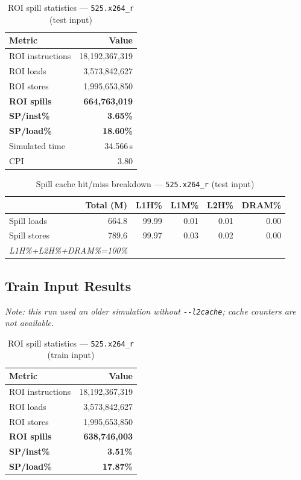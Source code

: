 \documentclass[11pt,a4paper]{article}
\begin{document}
\begin{table}[H]
\centering
\caption{ROI spill statistics --- \texttt{525.x264\_r} (test input)}
\label{tab:x264_test_roi}
\begin{tabular}{lr}
\toprule
\textbf{Metric} & \textbf{Value} \\
\midrule
ROI instructions & 18,192,367,319 \\
ROI loads        & 3,573,842,627 \\
ROI stores       & 1,995,653,850 \\
\textbf{ROI spills}   & \textbf{664,763,019} \\
\textbf{SP/inst\%}   & \textbf{3.65\%} \\
\textbf{SP/load\%}   & \textbf{18.60\%} \\
Simulated time   & 34.566\,s \\
CPI              & 3.80 \\
\bottomrule
\end{tabular}
\end{table}

\begin{table}[H]
\centering
\caption{Spill cache hit/miss breakdown --- \texttt{525.x264\_r} (test input)}
\label{tab:x264_test_cache}
\begin{tabular}{lrrrrr}
\toprule
\textbf{} & \textbf{Total (M)} & \textbf{L1H\%} & \textbf{L1M\%} & \textbf{L2H\%} & \textbf{DRAM\%} \\
\midrule
Spill loads  & 664.8 & 99.99 & 0.01 & 0.01 & 0.00 \\
Spill stores & 789.6 & 99.97 & 0.03 & 0.02 & 0.00 \\
\multicolumn{2}{l}{\small\textit{L1H\%+L2H\%+DRAM\%=100\%}} \\
\bottomrule
\end{tabular}
\end{table}

\subsection{Train Input Results}

\textit{Note: this run used an older simulation without \texttt{-{}-l2cache}; cache counters are not available.}


\begin{table}[H]
\centering
\caption{ROI spill statistics --- \texttt{525.x264\_r} (train input)}
\label{tab:x264_train_roi}
\begin{tabular}{lr}
\toprule
\textbf{Metric} & \textbf{Value} \\
\midrule
ROI instructions & 18,192,367,319 \\
ROI loads        & 3,573,842,627 \\
ROI stores       & 1,995,653,850 \\
\textbf{ROI spills}   & \textbf{638,746,003} \\
\textbf{SP/inst\%}   & \textbf{3.51\%} \\
\textbf{SP/load\%}   & \textbf{17.87\%} \\
\bottomrule
\end{tabular}
\end{table}
\end{document}
